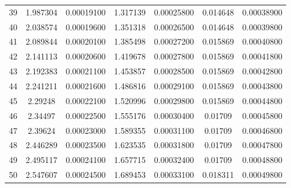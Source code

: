 \begin{table}[h]
{\begin{tabular}{ccccccc}
  39     & 1.987304 & 0.00019100 & 1.317139 & 0.00025800 & 0.014648 & 0.00038900 \\
  40     & 2.038574 & 0.00019600 & 1.351318 & 0.00026500 & 0.014648 & 0.00039800 \\
  41     & 2.089844 & 0.00020100 & 1.385498 & 0.00027200 & 0.015869 & 0.00040800 \\
  42     & 2.141113 & 0.00020600 & 1.419678 & 0.00027800 & 0.015869 & 0.00041800 \\
  43     & 2.192383 & 0.00021100 & 1.453857 & 0.00028500 & 0.015869 & 0.00042800 \\
  44     & 2.241211 & 0.00021600 & 1.486816 & 0.00029100 & 0.015869 & 0.00043800 \\
  45     & 2.29248  & 0.00022100 & 1.520996 & 0.00029800 & 0.015869 & 0.00044800 \\
  46     & 2.34497  & 0.00022500 & 1.555176 & 0.00030400 & 0.01709  & 0.00045800 \\
  47     & 2.39624  & 0.00023000 & 1.589355 & 0.00031100 & 0.01709  & 0.00046800 \\
  48     & 2.446289 & 0.00023500 & 1.623535 & 0.00031800 & 0.01709  & 0.00047800 \\
49     & 2.495117 & 0.00024100 & 1.657715 & 0.00032400 & 0.01709  & 0.00048800 \\
50     & 2.547607 & 0.00024500 & 1.689453 & 0.00033100 & 0.018311 & 0.00049800 \\
\hline
\end{tabular}
}
\end{table}

